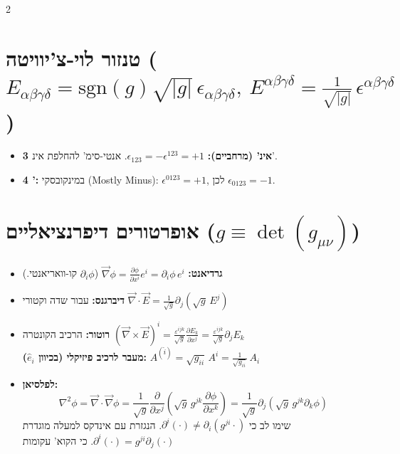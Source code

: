 \documentclass[10pt,a4paper]{article}
\begin{document}
\begin{multicols*}{2}
\section*{טנזור לוי-צ'יוויטה ( $E_{\alpha\beta\gamma\delta} = \text{sgn}(g)\sqrt{|g|}\,\epsilon_{\alpha\beta\gamma\delta}, \ E^{\alpha\beta\gamma\delta} = \frac{1}{\sqrt{|g|}}\,\epsilon^{\alpha\beta\gamma\delta}$)}
\begin{itemize}
     \item \textbf{3 אינ' (מרחביים):} $\epsilon_{123} = -\epsilon^{123} = +1$. אנטי-סימ' להחלפת אינ'.
    \item \textbf{4 ':} במינקובסקי (\textenglish{Mostly Minus}): $\epsilon^{0123} = +1$, לכן $\epsilon_{0123} = -1$.
\end{itemize}

\section{אופרטורים דיפרנציאליים ($g \equiv \det(g_{\mu\nu})$)}

\begin{itemize}
    \item \textbf{גרדיאנט:} 
    $ \vec{\nabla}\phi = \frac{\partial \phi}{\partial x^i} e^i = \partial_i \phi \, e^i
    $
    ($\partial_i \phi$ קו-וואריאנטי.)

    \item \textbf{דיברגנס:} עבור שדה וקטורי
    $
    \vec{\nabla} \cdot \vec{E} = \frac{1}{\sqrt{g}} \partial_j \left( \sqrt{g} \, E^j \right)
    $

    \item \textbf{רוטור:} הרכיב הקונטרה 
    $ (\vec{\nabla} \times \vec{E})^i = \frac{\varepsilon^{ijk}}{\sqrt{g}} \frac{\partial E_k}{\partial x^j} = \frac{\varepsilon^{ijk}}{\sqrt{g}} \partial_j E_k
    $ \\
    \textbf{מעבר לרכיב פיזיקלי (בכיוון $\hat{e}_i$):} $A^{(\hat{i})} = \sqrt{g_{ii}} \, A^i = \frac{1}{\sqrt{g_{ii}}} \, A_i$

    \item \textbf{לפלסיאן:}
    \[
    \nabla^2 \phi = \vec{\nabla} \cdot \vec{\nabla}\phi = \frac{1}{\sqrt{g}} \frac{\partial}{\partial x^j} \left( \sqrt{g} \, g^{jk} \frac{\partial \phi}{\partial x^k} \right) = \frac{1}{\sqrt{g}} \partial_j \left( \sqrt{g} \, g^{jk} \partial_k \phi \right)
    \]
    שימו לב כי $\partial^i(\cdot) \neq \partial_i(g^{ji}\cdot)$.
    הנגזרת עם אינדקס למעלה מוגדרת $\partial^i(\cdot) = g^{ji} \partial_j(\cdot)$. כי הקוא' עקומות


\end{itemize}
\end{multicols*}
\end{document}
